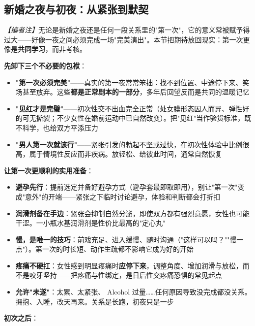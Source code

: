 \subsection{新婚之夜与初夜：从紧张到默契}

\noindent\textit{【编者注】}无论是新婚之夜还是任何一段关系里的"第一次"，它的意义常被赋予得过大——好像一夜之间必须完成一场"完美演出"。本节把期待放回现实：第一次更像是\textbf{共同学习}，而非考核。

\vspace{0.5em}
\noindent\textbf{先卸下三个不必要的包袱}：

\begin{itemize}
	\item \textbf{"第一次必须完美"}——真实的第一夜常常笨拙：找不到位置、中途停下来、笑场甚至放弃。这些\textbf{都是正常剧本的一部分}，多年后回望反而是共同的温暖记忆
	\item \textbf{"见红才是完璧"}——初次性交不出血完全正常（处女膜形态因人而异、弹性好的可无撕裂；不少女性在婚前运动中已自然改变）。把"见红"当作验货标准，既不科学，也给双方平添压力
	\item \textbf{"男人第一次就该行"}——紧张引发的勃起不坚或过快，在初次性体验中比例很高，属于情境性反应而非疾病。放轻松、给彼此时间，通常自然恢复
\end{itemize}

\vspace{0.5em}
\noindent\textbf{让第一次更顺利的实用准备}：

\begin{itemize}
	\item \textbf{避孕先行}：提前选定并备好避孕方式（避孕套最即取即用），别让"第一次"变成"意外"的开端——紧张之下临时讨论避孕，体验和判断都会打折扣
	\item \textbf{润滑剂备在手边}：紧张会抑制自然分泌，即使双方都有强烈意愿，女性也可能干涩。一小瓶水基润滑剂是性价比最高的"定心丸"
	\item \textbf{慢，是唯一的技巧}：前戏充足、进入缓慢、随时沟通（"这样可以吗？""慢一点"）。第一次的时长短、动作生疏都不影响它成为好的开始
	\item \textbf{疼痛不硬扛}：女性感到明显疼痛时\textbf{应停下来}，调整角度、增加润滑与放松，而不是咬牙坚持——把疼痛与性绑定，是日后性交疼痛恐惧的常见起点
	\item \textbf{允许"未遂"}：太累、太紧张、 Alcohol 过量……任何原因导致没完成都没关系。拥抱、入睡，改天再来。关系是长跑，初夜只是一步
\end{itemize}

\vspace{0.5em}
\noindent\textbf{初次之后}：

